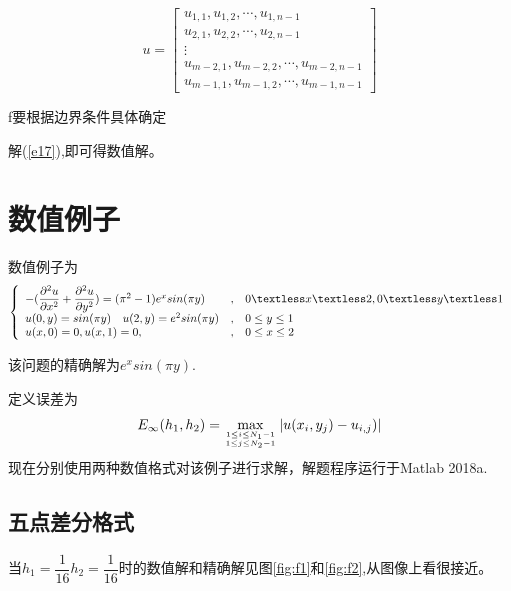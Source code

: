 \documentclass[withoutpreface,bwprint]{cumcmthesis} %
\begin{document}
$$
u=
\begin{bmatrix}
u_{1,1},u_{1,2},\cdots,u_{1,n-1}\\
u_{2,1},u_{2,2},\cdots,u_{2,n-1}\\
\vdots\\
u_{m-2,1},u_{m-2,2},\cdots,u_{m-2,n-1}\\
u_{m-1,1},u_{m-1,2},\cdots,u_{m-1,n-1}
\end{bmatrix}
$$

f要根据边界条件具体确定

解(\ref{e17}),即可得数值解。

\section{数值例子}
数值例子为
\begin{equation}
\left\{
\begin{array}{lcl}
-(\dfrac{\partial^2{u}}{\partial{x^2}}+\dfrac{\partial^2{u}}{\partial{y^2}})=(\pi^2-1)e^xsin(\pi y) &,&0 \textless x \textless 2,0 \textless y \textless 1 \\

u(0,y)=sin(\pi y) \quad u(2,y)=e^2sin(\pi y)&, & 0 \leq y \leq 1 \\

u(x,0)=0,u(x,1)=0,&, &0 \leq x \leq 2
\end{array}
\right.
\end{equation}

该问题的精确解为$e^xsin(\pi y)$.

定义误差为$$ E_{\infty}(h_1,h_2)=\max \limits_{1 \leq i \leq N_1-1 \atop 1 \leq j \leq N_2-1 } |u(x_{i},y_{j})-u_{i,j})| $$
现在分别使用两种数值格式对该例子进行求解，解题程序运行于Matlab 2018a.
\subsection{五点差分格式}
当$h_1=\dfrac{1}{16}$\quad$h_2=\dfrac{1}{16}$时的数值解和精确解见图\ref{fig:f1}和\ref{fig:f2},从图像上看很接近。
\end{document}
